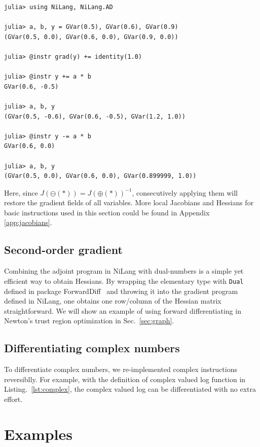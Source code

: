 \documentclass{article}
\newcommand{\<}{\langle}
\renewcommand{\>}{\rangle}
\newcommand{\Lst}[1]{Listing.~\ref{#1}}
\newcommand{\Sec}[1]{Sec.~\ref{#1}}
\newcommand{\App}[1]{Appendix \ref{#1}}
\theoremstyle{definition}\newtheorem{definition}{\textit{Definition}}
\begin{document}
\begin{minipage}{.88\columnwidth}
\begin{lstlisting}[mathescape=true]
julia> using NiLang, NiLang.AD

julia> a, b, y = GVar(0.5), GVar(0.6), GVar(0.9)
(GVar(0.5, 0.0), GVar(0.6, 0.0), GVar(0.9, 0.0))

julia> @instr grad(y) += identity(1.0)

julia> @instr y += a * b
GVar(0.6, -0.5)

julia> a, b, y
(GVar(0.5, -0.6), GVar(0.6, -0.5), GVar(1.2, 1.0))

julia> @instr y -= a * b
GVar(0.6, 0.0)

julia> a, b, y
(GVar(0.5, 0.0), GVar(0.6, 0.0), GVar(0.899999, 1.0))
\end{lstlisting}
\end{minipage}

Here, since $J(\ominus(*)) = J(\oplus(*))^{-1}$, consecutively applying them will restore the gradient fields of all variables.
More local Jacobians and Hessians for basic instructions used in this section could be found in \App{app:jacobians}.

\subsection{Second-order gradient}
Combining the adjoint program in NiLang with dual-numbers is a simple yet efficient way to obtain Hessians.
By wrapping the elementary type with \texttt{Dual} defined in package ForwardDiff~\cite{Revels2016} and throwing it into the gradient program defined in NiLang,
one obtains one row/column of the Hessian matrix straightforward.
We will show an example of using forward differentiating in Newton's trust region optimization in \Sec{sec:graph}.

\subsection{Differentiating complex numbers}
To differentiate complex numbers, we re-implemented complex instructions reversiblly. For example, with the definition of complex valued log function in \Lst{lst:complex}, the complex valued log can be differentiated with no extra effort.

\section{Examples}\label{sec:example}
\end{document}
